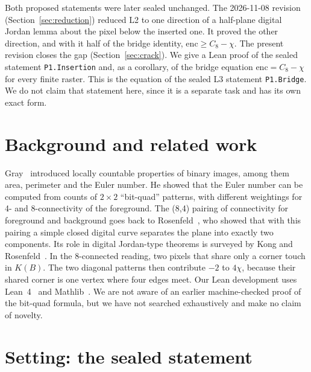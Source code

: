 \documentclass[11pt]{article}
\theoremstyle{definition}
\theoremstyle{remark}
\begin{document}
Both proposed statements were later sealed unchanged. The 2026-11-08 revision
(Section~\ref{sec:reduction}) reduced L2 to one direction of a half-plane digital
Jordan lemma about the pixel below the inserted one. It proved the other direction,
and with it half of the bridge identity, $\mathrm{enc}\ge C_8-\chi$. The present
revision closes the gap (Section~\ref{sec:crack}). We give a Lean proof of
the sealed statement \texttt{P1.Insertion} and, as a corollary, of the bridge
equation $\mathrm{enc}=C_8-\chi$ for every finite raster. This is the equation of
the sealed L3 statement \texttt{P1.Bridge}. We do not claim that statement here,
since it is a separate task and has its own exact form.

\section{Background and related work}

Gray~\cite{Gray1971} introduced locally countable properties of binary images,
among them area, perimeter and the Euler number. He showed that the Euler number
can be computed from counts of $2\times2$ ``bit-quad'' patterns, with different
weightings for 4- and 8-connectivity of the foreground. The (8,4) pairing of
connectivity for foreground and background goes back to
Rosenfeld~\cite{Rosenfeld1970}, who showed that with this pairing a simple closed
digital curve separates the plane into exactly two components. Its role in
digital Jordan-type theorems is surveyed by Kong and
Rosenfeld~\cite{KongRosenfeld1989}.
In the 8-connected reading, two pixels that share only a corner touch in $K(B)$.
The two diagonal patterns then contribute $-2$ to $4\chi$, because their
shared corner is one vertex where four edges meet. Our Lean development uses
Lean~4~\cite{Lean4} and Mathlib~\cite{Mathlib2020}. We are not aware of an
earlier machine-checked proof of the bit-quad formula, but we have not searched
exhaustively and make no claim of novelty.

\section{Setting: the sealed statement}\label{sec:l1start}
\end{document}
